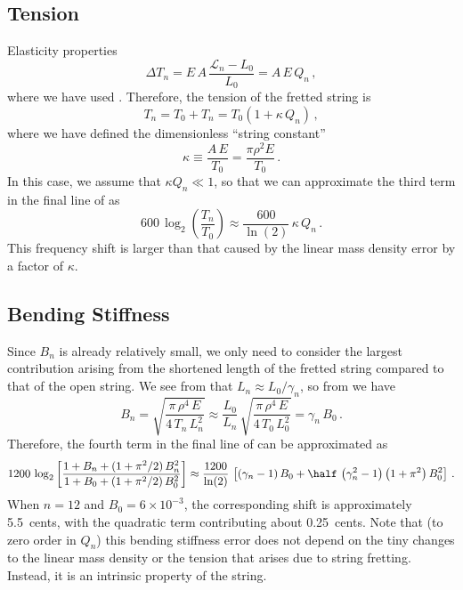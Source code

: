  \subsection{Tension\label{sct:model_tension}}
Elasticity properties~\cite{ref:landau1986toe}
 \begin{equation} \label{eqn:youngs_mod_def}
\Delta T_n = E\, A\, \frac{\mathcal{L}_n - L_0}{L_0} = A\, E\, Q_n\, ,
 \end{equation}
where we have used . Therefore, the tension of the fretted string is
 \begin{equation}
T_n = T_0 + T_n = T_0 \left( 1 + \kappa\, Q_n \right)\, ,
 \end{equation}
where we have defined the dimensionless ``string constant''
 \begin{equation}\label{eqn:kappa_def}
\kappa \equiv \frac{A\, E}{T_0} = \frac{\pi \rho^2 E}{T_0}\, .
 \end{equation}
In this case, we assume that $\kappa Q_n \ll 1$, so that we can approximate the third term in the final line of  as
 \begin{equation}
600\, \log_2 \left(  \frac{T_n}{T_0} \right) \approx \frac{600}{\ln(2)}\, \kappa\, Q_n\, .
 \end{equation}
This frequency shift is larger than that caused by the linear mass density error by a factor of $\kappa$.

 \subsection{Bending Stiffness}

Since $B_n$ is already relatively small, we only need to consider the largest contribution arising from the shortened length of the fretted string compared to that of the open string. We see from  that $L_n \approx L_0/\gamma_n$, so from  we have
 \begin{equation}
B_n = \sqrt{\frac{\pi\, \rho^4\, E}{4\, T_n\, L_n^2}} \approx \frac{L_0}{L_n}\, \sqrt{\frac{\pi\, \rho^4\, E}{4\, T_0\, L_0^2}} = \gamma_n\, B_0\, .
 \end{equation}
Therefore, the fourth term in the final line of  can be approximated as
 \begin{equation}
1200\, \log_2 \left[ \frac{1 + B_n + (1 + \pi^2/2)\, B_n^2}{1 + B_0 + (1 + \pi^2/2)\, B_0^2} \right] \approx \frac{1200}{\ln(2)}\, \left[ \left(\gamma_n - 1\right) B_0 + \half\, \left(\gamma_n^2 - 1\right) \left(1 + \pi^2\right) B_0^2 \right]\, .
 \end{equation}
When $n = 12$ and $B_0 = 6 \times 10^{-3}$, the corresponding shift is approximately 5.5~cents, with the quadratic term contributing about 0.25~cents. Note that (to zero order in $Q_n$) this bending stiffness error does not depend on the tiny changes to the linear mass density or the tension that arises due to string fretting. Instead, it is an intrinsic property of the string.\bigskip

